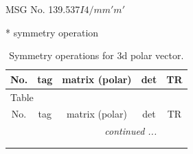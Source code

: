 \documentclass[fleqn,8pt]{jsarticle}
\begin{document}
\setcounter{MaxMatrixCols}{32}

\renewcommand{\tablename}{Table~}
\renewcommand{\figurename}{Figure~}
\begin{center}
\LARGE
MSG No. 139.537\quad$I4/mm'm'$
\end{center}
* symmetry operation
\renewcommand{\arraystretch}{1.3}
\begin{longtable}{ccccc}
\caption{Symmetry operations for 3d polar vector.}
 \\
 \hline \hline
No. & tag & matrix (polar) & det & TR \\ \hline \endfirsthead

\multicolumn{4}{l}{\tablename\ \thetable{}} \\
 \hline \hline
No. & tag & matrix (polar) & det & TR \\ \hline \endhead

 \hline \hline
\multicolumn{4}{r}{\footnotesize\it continued ...} \\ \endfoot

 \hline \hline
\multicolumn{4}{r}{} \\ \endlastfoot


\end{longtable}
\end{document}
